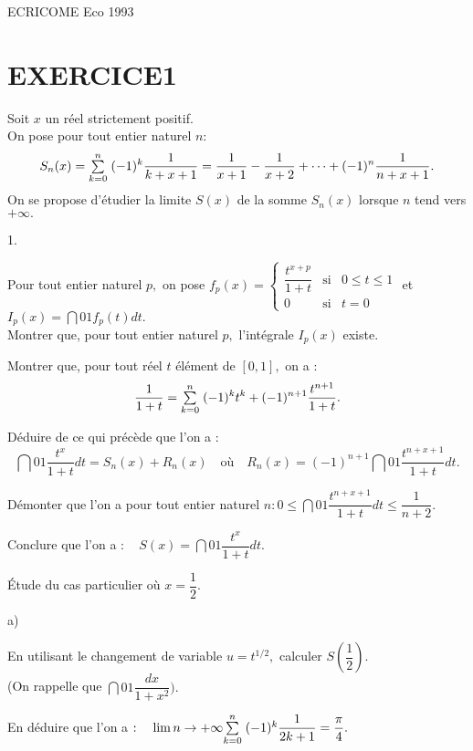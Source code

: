 \documentclass[11pt]{article}%
\begin{document}
\begin{center}
{\Huge ECRICOME Eco 1993}
\end{center}

\section*{EXERCICE1}

Soit $x$ un réel strictement positif.\\
On pose pour tout entier naturel $n :$
\[
S_{n}(x) = {\textstyle\sum\limits_{k = 0}^{n}}\hspace{.1cm}(-1)^{k}\dfrac{1}{k + x + 1} = \dfrac{1}{x +
1}-\dfrac{1}{x + 2} + \cdots + (-1)^{n}\dfrac{1}{n + x + 1}.
\]
On se propose d'étudier la limite $S(x)$ de la somme $S_{n}(x)$ lorsque
$n$
tend vers $ + \infty.$

\begin{noliste}{1.}
 \setlength{\itemsep}{4mm}
\item Pour tout entier naturel $p,$ on pose $f_{p}(x) = \left\{ 
\begin{array}{ccc}
\dfrac{t^{x + p}}{1 + t} & \text{si} & 0\leq t\leq 1 \\
0 & \text{si} & t = 0
\end{array}
\right. $ et $I_{p}(x) = \dint{0}{1}f_{p}(t)dt.$\\
Montrer que, pour tout entier naturel $p,$ l'intégrale $I_{p}(x)$
existe.

\item Montrer que, pour tout réel $t$ élément de $[0,1],$ on a :
\[
\dfrac{1}{1 + t} = {\textstyle\sum\limits_{k = 0}^{n}}\hspace{.1cm}(-1)^{k}t^{k} + (-1)^{n +
1}\dfrac{t^{n + 1}}{1 + t}.
\]

\item Déduire de ce qui précède que l'on a :
\[
\dint{0}{1}\dfrac{t^{x}}{1 + t}dt = S_{n}(x) + R_{n}(x)\quad
\text{où}\quad R_{n}(x) = (-1)^{n + 1}\dint{0}{1}\dfrac{t^{n + x +
1}}{1 + t}dt.
\]

\item Démonter que l'on a pour tout entier naturel $n :0\leq
\dint{0}{1}\dfrac{t^{n + x + 1}}{1 + t}dt\leq \dfrac{1}{n + 2}.$

\item Conclure que l'on a $ :\quad S(x) = \dint{0}{1}\dfrac{t^{x}}{1 +
t}dt.$

\item Étude du cas particulier où $x = \dfrac{1}{2}.$

\begin{noliste}{a)}
 \setlength{\itemsep}{2mm}
\item En utilisant le changement de variable $u = t^{1/2},$ calculer
$S(\dfrac{1}{2})$.\\
(On rappelle que $\dint{0}{1}\dfrac{dx}{1 + x^{2}}).$

\item En déduire que l'on a $ :\quad \lim{n\rightarrow + \infty
}{\textstyle\sum\limits_{k = 0}^{n}}\hspace{.1cm}(-1)^{k}\dfrac{1}{2k + 1} = \dfrac{\pi }{4}.$
\end{noliste}
\end{noliste}
\end{document}
